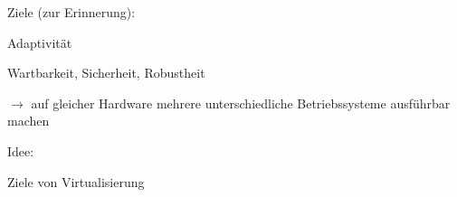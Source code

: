 \documentclass[a4paper]{article}
\begin{document}
\begin{multicols}{3}
    \begin{itemize*}
        \item
        Ziele (zur Erinnerung):
        \begin{itemize*}
            \item Adaptivität
            \item Wartbarkeit, Sicherheit, Robustheit
            \item $\rightarrow$  auf gleicher Hardware mehrere unterschiedliche Betriebssysteme ausführbar machen
        \end{itemize*}
        \item
        Idee:
    \end{itemize*}

    Ziele von Virtualisierung


\end{multicols}
\end{document}
